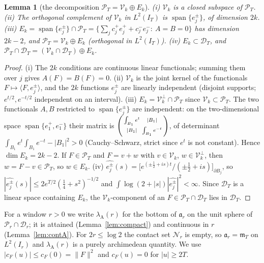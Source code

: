 \documentclass[10pt]{amsart}
\newtheorem{lemma}[theorem]{Lemma}
\theoremstyle{definition}
\theoremstyle{remark}
\newcommand{\PT}{\mathcal P_T}
\newcommand{\IT}{I_T}
\newcommand{\cF}{c_F}
\newcommand{\mT}{\mathfrak m_T}
\begin{document}
\begin{lemma}[the decomposition $\PT=\mathcal V_k\oplus E_k$]\label{lem:coer-decomp}
\emph{(i)} $\mathcal V_k$ is a closed subspace of $\PT$. \emph{(ii)} The orthogonal complement of
$\mathcal V_k$ in $L^2(\IT)$ is $\operatorname{span}\{e_j^\pm\}$, of dimension $2k$.
\emph{(iii)} $E_k=\operatorname{span}\{e_j^\pm\}\cap\PT=\{\sum_jc_j^+e_j^++c_j^-e_j^-:\ A=B=0\}$ has
dimension $2k-2$, and $\PT=\mathcal V_k\oplus E_k$ (orthogonal in $L^2(\IT)$).
\emph{(iv)} $E_k\subset\mathcal D_T$, and $\PT\cap\mathcal D_T=(\mathcal V_k\cap\mathcal D_T)\oplus E_k$.
\end{lemma}
\begin{proof}
(i) The $2k$ conditions are continuous linear functionals; summing them over $j$ gives $A(F)=B(F)=0$.
(ii) $\mathcal V_k$ is the joint kernel of the functionals $F\mapsto\langle F,e_j^\pm\rangle$, and the $2k$
functions $e_j^\pm$ are linearly independent (disjoint supports; $e^{t/2},e^{-t/2}$ independent on an
interval). (iii) $E_k=\mathcal V_k^\perp\cap\PT$ since $\mathcal V_k\subset\PT$. The two functionals
$A,B$ restricted to $\operatorname{span}\{e_j^\pm\}$ are independent: on the two-dimensional space
$\operatorname{span}\{e_1^+,e_1^-\}$ their matrix is
$\begin{psmallmatrix}\int_{B_1}e^t&|B_1|\\|B_1|&\int_{B_1}e^{-t}\end{psmallmatrix}$, of determinant
$\int_{B_1}e^t\int_{B_1}e^{-t}-|B_1|^2>0$ (Cauchy--Schwarz, strict since $e^t$ is not constant). Hence
$\dim E_k=2k-2$. If $F\in\PT$ and $F=v+w$ with $v\in\mathcal V_k$, $w\in\mathcal V_k^\perp$, then
$w=F-v\in\PT$, so $w\in E_k$. (iv) $\widehat{e_j^\pm}(s)=\big[e^{(\pm\frac12+is)t}/(\pm\frac12+is)\big]_{\partial B_j}$,
so $|\widehat{e_j^\pm}(s)|\le2e^{T/2}(\frac14+s^2)^{-1/2}$ and $\int\log(2+|s|)|\widehat{e_j^\pm}|^2<\infty$.
Since $\mathcal D_T$ is a linear space containing $E_k$, the $\mathcal V_k$-component of an $F\in\PT\cap\mathcal D_T$
lies in $\mathcal D_T$.
\end{proof}

For a window $r>0$ we write $\lambda_{\mathrm A}(r)$ for the bottom of $\mathfrak a_r$ on the unit sphere of
$\mathcal P_r\cap\mathcal D_r$; it is attained (Lemma~\ref{lem:compact}) and continuous in $r$ (Lemma~\ref{lem:contA}).
For $2r\le\log2$ the contact set $\mathcal N_r$ is empty, so $\mathfrak a_r=\mT$ on $L^2(I_r)$ and $\lambda_{\mathrm A}(r)$ is a
purely archimedean quantity. We use $|\cF(u)|\le\cF(0)=\|F\|^2$ and $\cF(u)=0$ for $|u|\ge2T$.
\end{document}
